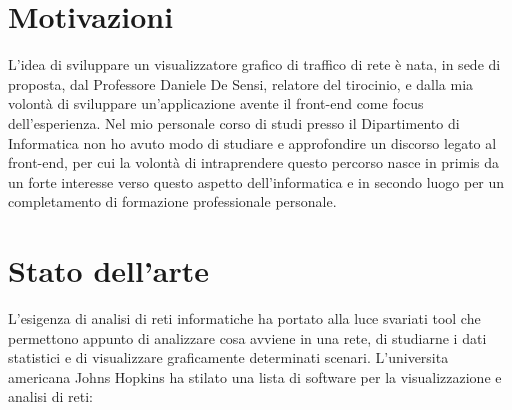 \documentclass[binding=0.6cm]{sapthesis}
\begin{document}
\section{Motivazioni}
L'idea di sviluppare un visualizzatore grafico di traffico di rete è nata, 
in sede di proposta, dal Professore Daniele De Sensi, relatore del tirocinio, e dalla mia volontà di sviluppare un'applicazione avente il front-end
come focus dell'esperienza. Nel mio personale corso di studi presso il Dipartimento di Informatica non ho avuto modo
di studiare e approfondire un discorso legato al front-end, per cui la volontà di intraprendere questo percorso
nasce in primis da un forte interesse verso questo aspetto dell'informatica e in secondo luogo per un completamento di formazione professionale personale.
\section{Stato dell'arte}
\label{sec:stato_arte}
L'esigenza di analisi di reti informatiche ha portato alla luce svariati tool che permettono
appunto di analizzare cosa avviene in una rete, di studiarne i dati statistici e di visualizzare
graficamente determinati scenari. L'universita americana Johns Hopkins\cite{JohnsHopkinsUniversity2024} ha stilato una lista
di software per la visualizzazione e analisi di reti\cite{JHUDatavisNetwork2024}:
\end{document}
